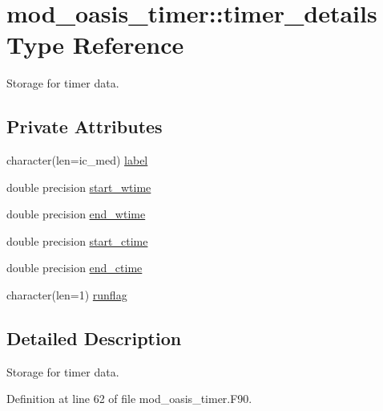 \hypertarget{structmod__oasis__timer_1_1timer__details}{\section{mod\+\_\+oasis\+\_\+timer\+:\+:timer\+\_\+details Type Reference}
\label{structmod__oasis__timer_1_1timer__details}
}


Storage for timer data.  


\subsection*{Private Attributes}
\begin{DoxyCompactItemize}
\item 
character(len=ic\+\_\+med) \hyperlink{structmod__oasis__timer_1_1timer__details_a772c22856aef70d86030ba7aed99f85d}{label}
\item 
double precision \hyperlink{structmod__oasis__timer_1_1timer__details_a1b05dff81a75201d26ba232a265f70d0}{start\+\_\+wtime}
\item 
double precision \hyperlink{structmod__oasis__timer_1_1timer__details_af4ddda3c6547e993f367a5221671c50b}{end\+\_\+wtime}
\item 
double precision \hyperlink{structmod__oasis__timer_1_1timer__details_a2922806fc675af7b8aa9ab042bddfc24}{start\+\_\+ctime}
\item 
double precision \hyperlink{structmod__oasis__timer_1_1timer__details_a6203f13dc289b25e994b08b837636afc}{end\+\_\+ctime}
\item 
character(len=1) \hyperlink{structmod__oasis__timer_1_1timer__details_ac91fc6e6c7d8bca9c4519b506714384a}{runflag}
\end{DoxyCompactItemize}


\subsection{Detailed Description}
Storage for timer data. 

Definition at line 62 of file mod\+\_\+oasis\+\_\+timer.\+F90.



